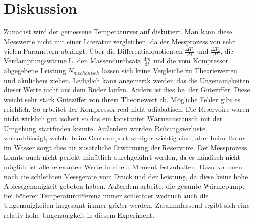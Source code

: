 \section{Diskussion}
\label{sec:Diskussion}
Zunächst wird der gemessene Temperaturverlauf diskutiert. Man kann diese Messwerte nicht mit einer Literatur vergleichen, da der Messprozess von sehr vielen Parametern abhängt. 
Über die Differentialquotienten $\frac{\Delta T_1}{\Delta t}$ und $\frac{\Delta T_2}{\Delta t}$, die Verdampfungswärme L, den Massendurchsatz $\frac{\text{d}m}{\text{d}t}$ und 
die vom Kompressor abgegebene Leistung $N_{mechanisch}$ lassen sich keine Vergleiche zu Theoriewerten und ähnlichem ziehen. Lediglich kann angemertk werden das die Ungenauigkeiten 
dieser Werte nicht aus dem Ruder laufen. Anders ist dies bei der Güteziffer. Diese weicht sehr stark Güteziffer von ihrem Theoriewert ab. Mögliche Fehler gibt es reichlich. So arbeitet
der Kompressor real nicht adiabatisch. Die Reservoire waren nicht wirklich gut isoliert so das ein konstanter Wärmeaustausch mit der Umgebung stattfinden konnte. Außerdem wurden 
Reibungsverluste vernachlässigt, welche beim Gastransport weniger wichtig sind, aber beim Rotor im Wasser sorgt dies für zusätzliche Erwärmung der Reservoire. 
Der Messprozess konnte auch nicht perfekt minütlich durchgeführt werden, da es händisch nicht möglich ist alle relevanten Werte in einem Moment festzuhalten. Dazu kommen noch die 
schlechten Messgeräte vom Druck und der Leistung, da diese keine hohe Ablesegenauigkeit geboten haben. Außerdem arbeitet die gesamte Wärmepumpe bei höherer Temperaturdifferenz
immer schlechter wodruch auch die Ungenauigkeiten insgesamt immer größer werden. Zusammfassend ergibt sich eine relativ hohe Ungenauigkeit in diesem Experiment. 